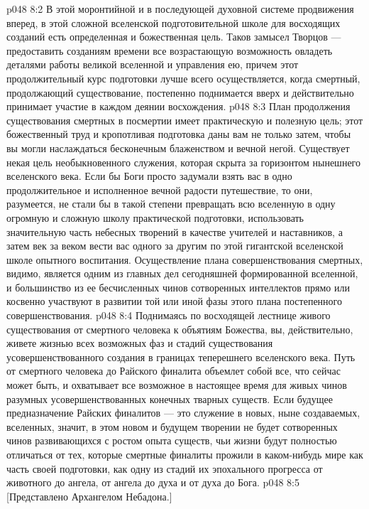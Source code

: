 \vs p048 8:2 В этой моронтийной и в последующей духовной системе продвижения вперед, в этой сложной вселенской подготовительной школе для восходящих созданий есть определенная и божественная цель. Таков замысел Творцов --- предоставить созданиям времени все возрастающую возможность овладеть деталями работы великой вселенной и управления ею, причем этот продолжительный курс подготовки лучше всего осуществляется, когда смертный, продолжающий существование, постепенно поднимается вверх и действительно принимает участие в каждом деянии восхождения.
\vs p048 8:3 План продолжения существования смертных в посмертии имеет практическую и полезную цель; этот божественный труд и кропотливая подготовка даны вам не только затем, чтобы вы могли наслаждаться бесконечным блаженством и вечной негой. Существует некая цель необыкновенного служения, которая скрыта за горизонтом нынешнего вселенского века. Если бы Боги просто задумали взять вас в одно продолжительное и исполненное вечной радости путешествие, то они, разумеется, не стали бы в такой степени превращать всю вселенную в одну огромную и сложную школу практической подготовки, использовать значительную часть небесных творений в качестве учителей и наставников, а затем век за веком вести вас одного за другим по этой гигантской вселенской школе опытного воспитания. Осуществление плана совершенствования смертных, видимо, является одним из главных дел сегодняшней формированной вселенной, и большинство из ее бесчисленных чинов сотворенных интеллектов прямо или косвенно участвуют в развитии той или иной фазы этого плана постепенного совершенствования.
\vs p048 8:4 Поднимаясь по восходящей лестнице живого существования от смертного человека к объятиям Божества, вы, действительно, живете жизнью всех возможных фаз и стадий существования усовершенствованного создания в границах теперешнего вселенского века. Путь от смертного человека до Райского финалита объемлет собой все, что сейчас может быть, и охватывает все возможное в настоящее время для живых чинов разумных усовершенствованных конечных тварных существ. Если будущее предназначение Райских финалитов --- это служение в новых, ныне создаваемых, вселенных, значит, в этом новом и будущем творении не будет сотворенных чинов развивающихся с ростом опыта существ, чьи жизни будут полностью отличаться от тех, которые смертные финалиты прожили в каком\hyp{}нибудь мире как часть своей подготовки, как одну из стадий их эпохального прогресса от животного до ангела, от ангела до духа и от духа до Бога.
\vsetoff
\vs p048 8:5 [Представлено Архангелом Небадона.]
